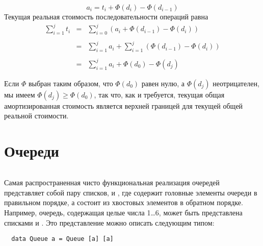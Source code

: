 \begin{frame}[fragile]{}
$$
a_i = t_i + \Phi(d_i) - \Phi(d_{i-1})
$$
Текущая реальная стоимость последовательности операций равна
$$
\begin{array}{rcl}
\sum_{i=1}^j t_i & = & \sum_{i=0}^j (a_i + \Phi(d_{i-1}) - \Phi(d_i))\\
\\
& = & \sum_{i=1}^j a_i + \sum_{i=1}^j (\Phi(d_{i-1}) - \Phi(d_i)) \\
\\
& = & \sum_{i=1}^j a_i + \Phi(d_0) - \Phi(d_j)
\end{array}
$$

Если $\Phi$ выбран таким образом, что
$\Phi(d_0)$ равен нулю, а $\Phi(d_j)$ неотрицателен, мы имеем
$\Phi(d_j) \ge \Phi(d_0)$, так что, как и требуется, текущая общая
амортизированная стоимость является верхней границей для текущей общей
реальной стоимости.

\end{frame}

\begin{comment}
\begin{remark}
Такое описание метода физика несколько упрощает
картину. Часто при анализе оказывается трудно втиснуть реальное
положение дел в указанные рамки. Например, что делать с функциями,
которые порождают или возвращают более одного объекта? Однако даже
упрощенное описание достаточно для демонстрации основных идей.
\end{remark}

\end{comment}

\section{Очереди}
\label{sc:5.2}


\begin{frame}[fragile]{}

\begin{minipage}{.4\textwidth}
  \inputminted[firstline=5,lastline=11] {haskell}{code/Queue.lhs}
\end{minipage}
\begin{minipage}{.55\textwidth}
  Самая распространенная чисто функциональная реализация очередей
  представляет собой пару списков,  и , где
   содержит головные элементы очереди в правильном порядке,
  а  состоит из хвостовых элементов в обратном порядке.\\
  
  Например, очередь, содержащая целые числа 1\ldots 6, может быть
  представлена списками  и
  . Это представление можно описать следующим
  типом:
  \begin{verbatim}
  data Queue a = Queue [a] [a]
  \end{verbatim}
  
\end{minipage}
\end{frame}


